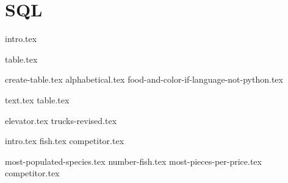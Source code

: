 \documentclass{exam}
\begin{document}
\section{SQL}
{intro.tex}
\newpage
\begin{questions}
  \question
  {table.tex}
  \begin{parts}
    {create-table.tex}
    {alphabetical.tex}
    {food-and-color-if-language-not-python.tex}
  \end{parts}

  \newpage
  \question
  {text.tex}
  {table.tex}
  \begin{parts}
    {elevator.tex}
    {trucks-revised.tex}
  \end{parts}
  
  \newpage
  \question 
  {intro.tex}
  {fish.tex}
  {competitor.tex}
  \begin{parts}
    {most-populated-species.tex}
    {number-fish.tex}
    {most-pieces-per-price.tex}
    {competitor.tex}
  \end{parts}
\end{questions}
\end{document}
